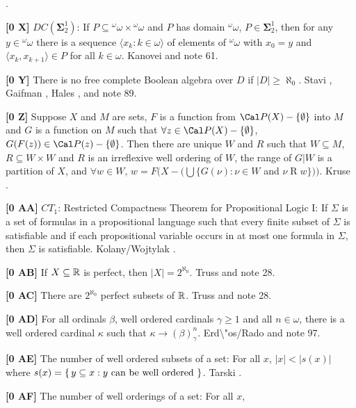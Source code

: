\cite{1980}.
\smallskip
\item{}{\bf [0 X]} $DC(\boldsymbol\Sigma^1_2)$: If $P \subseteq{}^{\omega}
\omega\times{}^{\omega}\omega$ and $P$ has domain ${}^{\omega}\omega$,
$P \in\boldsymbol\Sigma^1_2$, then for any $y\in {}^{\omega}\omega$
there is a sequence $\langle x_{k}: k\in\omega\rangle$ of elements of
${}^{\omega }\omega$ with $x_{0}=y$ and $\langle x_k,x_{k+1}\rangle\in
P$ for all $k \in\omega $. \ac{Kanovei} \cite{1979} and note 61.
\smallskip
\item{}{\bf [0 Y]}  There is no free complete Boolean algebra over $D$ if
$|D|\ge \aleph_{0}$. \ac{Stavi} \cite{1975}, \ac{Gaifman} \cite{1970},
\ac{Hales} \cite{1964}, and note 89.
\smallskip
\item{}{\bf [0 Z]}  Suppose $X$ and $M$ are sets, $F$ is a function from
${\Cal P}(X) - \{\emptyset\}$ into $M$ and $G$ is a function on $M$ such
that $\forall z\in {\Cal P}(X) - \{\emptyset\}$, $G(F(z))\in {\Cal P}(z)
- \{\emptyset\}$.  Then there are unique $W$ and $R$ such that $W\subseteq
M$, $R\subseteq W\times W$ and $R$ is an irreflexive well ordering of $W$,
the range of $G|W$ is a partition of $X$, and $\forall w\in W$, $w =
F(X -(\bigcup\{G(\nu): \nu\in W$ and $\nu\mathrel R w\}))$.  \ac{Kruse}
\cite{1974}.
\smallskip
\item{}{\bf [0 AA]}  $CT_{1}$:  Restricted Compactness Theorem for
Propositional Logic I:  If $\Sigma$ is a set of formulas in a
propositional language such that every finite subset of $\Sigma$
is satisfiable and if each propositional variable occurs in at most one
formula in $\Sigma$, then $\Sigma$ is satisfiable.
\ac{Kolany/Wojtylak} \cite{1991}.
\smallskip
\item{}{\bf [0 AB]}  If $X\subseteq \Bbb R$ is perfect, then
$|X|= 2^{\aleph_0}$. \ac{Truss} \cite{1974b} and note 28.
\smallskip
\item{}{\bf [0 AC]}  There are $2^{\aleph_0}$ perfect subsets of
${\Bbb R}$. \ac{Truss} \cite{1974b} and note 28.
\smallskip
\item{}{\bf [0 AD]} For all ordinals $\beta$, well ordered cardinals
$\gamma \ge 1$ and all $n\in\omega$, there is a well ordered cardinal
$\kappa$ such that $\kappa\to (\beta)^{n}_{\gamma}$. \ac{Erd\"os/Rado}
\cite{1952} and note 97.
\smallskip
\item{}{\bf [0 AE]} The number of well ordered subsets of a set:  For all
$x$, $|x| < |s(x)|$ where $s(x) = \{\, y \subseteq x : y \hbox{ can be
well ordered } \}$.  \ac{Tarski} \cite{1939}.
\smallskip
\item{}{\bf [0 AF]} The number of well orderings of a set:  For all $x$,
